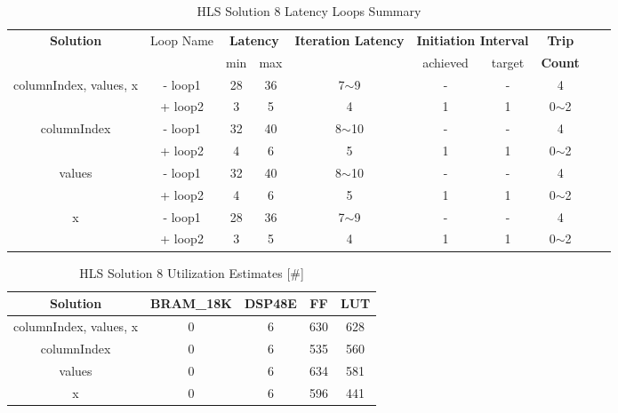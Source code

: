 \begin{table}[H]
	\centering
	\begin{tabular}{|c|c|c|c|c|c|c|c|c|c|}
		\hline
		\multicolumn{1}{|c|}{\textbf{Solution}} & \multicolumn{1}{|c|}{Loop Name} & \multicolumn{2}{|c|}{\textbf{Latency}} & \multicolumn{1}{c|}{\textbf{Iteration Latency}} & \multicolumn{2}{c|}{\textbf{Initiation Interval}} & \multicolumn{1}{c|}{\textbf{Trip}}  \\
		&  & min & max & & achieved & target & \textbf{Count} \\
		\hline
		columnIndex, values, x & - loop1 & 28 & 36 & 7$\sim$9 & - & - & 4 \\
		& + loop2 & 3 & 5 & 4 & 1 & 1 & 0$\sim$2 \\
		\hline
		columnIndex & - loop1 & 32 & 40 & 8$\sim$10 & - & - & 4 \\
		& + loop2 & 4 & 6 & 5 & 1 & 1 & 0$\sim$2 \\
		\hline
		values & - loop1 & 32 & 40 & 8$\sim$10 & - & - & 4 \\
		& + loop2 & 4 & 6 & 5 & 1 & 1 & 0$\sim$2 \\
		\hline
		x & - loop1 & 28 & 36 & 7$\sim$9 & - & - & 4 \\
		& + loop2 & 3 & 5 & 4 & 1 & 1 & 0$\sim$2 \\
		\hline
	\end{tabular}
	\caption{HLS Solution 8 Latency Loops Summary }
	\label{tab:hls-solution-8-loop-summary}
\end{table}

\begin{table}[H]
	\centering
	\begin{tabular}{|c|c|c|c|c|}
		\hline
		\textbf{Solution} & \textbf{BRAM\_18K} & \textbf{DSP48E} & \textbf{FF} & \textbf{LUT} \\
		\hline
		columnIndex, values, x & 0 & 6 & 630 & 628 \\
		\hline
		columnIndex & 0 & 6 & 535 & 560 \\
		\hline
		values & 0 & 6 & 634 & 581 \\
		\hline
		x & 0 & 6 & 596 & 441 \\
		\hline
	\end{tabular}
	\caption{HLS Solution 8 Utilization Estimates [\#]}
	\label{tab:hls-solution-8-utilization-report}
\end{table}

